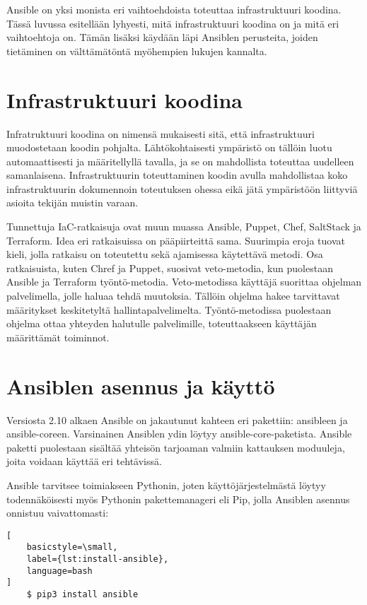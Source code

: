Ansible on yksi monista eri vaihtoehdoista toteuttaa infrastruktuuri koodina.
Tässä luvussa esitellään lyhyesti, mitä infrastruktuuri koodina on ja
mitä eri vaihtoehtoja on. Tämän lisäksi käydään läpi Ansiblen perusteita,
joiden tietäminen on välttämätöntä myöhempien lukujen kannalta.

\section{Infrastruktuuri koodina}

Infratruktuuri koodina on nimensä mukaisesti sitä, että infrastruktuuri
muodostetaan koodin pohjalta. Lähtökohtaisesti ympäristö on tällöin
luotu automaattisesti ja määritellyllä tavalla, ja se on mahdollista
toteuttaa uudelleen samanlaisena. Infrastruktuurin toteuttaminen koodin
avulla mahdollistaa koko infrastruktuurin dokumennoin toteutuksen ohessa
eikä jätä ympäristöön liittyviä asioita tekijän muistin varaan.
\parencite{KiefMorris2020IaC2}

Tunnettuja IaC-ratkaisuja ovat muun muassa Ansible, Puppet, Chef, SaltStack
ja Terraform. Idea eri ratkaisuissa on pääpiirteittä sama. Suurimpia eroja
tuovat kieli, jolla ratkaisu on toteutettu sekä ajamisessa käytettävä
metodi. Osa ratkaisuista, kuten Chref ja Puppet, suosivat veto-metodia,
kun puolestaan Ansible ja Terraform työntö-metodia. Veto-metodissa
käyttäjä suorittaa ohjelman palvelimella, jolle haluaa tehdä muutoksia.
Tällöin ohjelma hakee tarvittavat määritykset keskitetyltä hallintapalvelimelta.
Työntö-metodissa puolestaan ohjelma ottaa yhteyden halutulle palvelimille,
toteuttaakseen käyttäjän määrittämät toiminnot. \parencite{RitiPierluigi2021IaC}

\section{Ansiblen asennus ja käyttö}

Versiosta 2.10 alkaen Ansible on jakautunut kahteen eri pakettiin:
ansibleen ja ansible-coreen. Varsinainen Ansiblen ydin löytyy
ansible-core-paketista. Ansible paketti puolestaan sisältää yhteisön
tarjoaman valmiin kattauksen moduuleja, joita voidaan käyttää eri
tehtävissä. \parencite{AnsibleDocs}

Ansible tarvitsee toimiakseen Pythonin, joten käyttöjärjestelmästä
löytyy todennäköisesti myös Pythonin pakettemanageri eli Pip, jolla
Ansiblen asennus onnistuu vaivattomasti:

\begin{lstlisting}[
    basicstyle=\small,
    label={lst:install-ansible},
    language=bash
]
    $ pip3 install ansible
\end{lstlisting}

